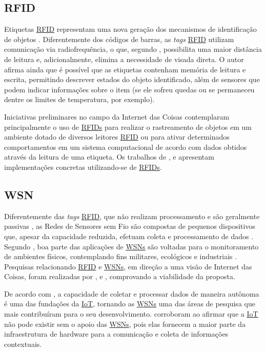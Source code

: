 \documentclass[twoside,english,brazilian]{UNISINOSmonografia}
\begin{document}
\subsection{RFID}
	Etiquetas \hyperref[siglas]{RFID} representam uma nova geração dos mecanismos de 
	identificação de objetos \cite{Brock2001}. Diferentemente dos códigos de 
	barras, as \textit{tags} \hyperref[siglas]{RFID} utilizam comunicação via radiofrequência, o 
	que, segundo , possibilita uma maior distância de 
	leitura e, adicionalmente, elimina a necessidade de visada direta. O autor 
	afirma ainda que é possível que as etiquetas contenham memória de leitura 
	e escrita, permitindo descrever estados do objeto identificado, além de 
	sensores que podem indicar informações sobre o item (se ele sofreu quedas 
	ou se permaneceu dentre os limites de temperatura, por exemplo).
	
	Iniciativas preliminares no campo da Internet das Coisas contemplaram 
	principalmente o uso de \hyperref[siglas]{RFIDs} para realizar o rastreamento de objetos em 
	um ambiente dotado de diversos leitores \hyperref[siglas]{RFID} ou para ativar determinados 
	comportamentos em um sistema computacional de acordo com dados obtidos 
	através da leitura de uma etiqueta. Os trabalhos de , 
	 e  apresentam 
	implementações concretas utilizando-se de \hyperref[siglas]{RFIDs}.

\subsection{WSN}
	Diferentemente das \textit{tags} \hyperref[siglas]{RFID}, que não realizam processamento e 
	são geralmente passivas \cite{Atzori2010b}, as Redes de Sensores sem Fio 
	são compostas de pequenos dispositivos que, apesar da capacidade reduzida, 
	efetuam coleta e processamento de dados \cite{Sakthidharan2012}. Segundo 
	, boa parte das aplicações de \hyperref[siglas]{WSNs} são voltadas para 
	o monitoramento de ambientes físicos, contemplando fins militares, 
	ecológicos e industriais \cite{Suhonen2012}. Pesquisas relacionando \hyperref[siglas]{RFID} e 
	\hyperref[siglas]{WSNs}, em direção a uma visão de Internet das Coisas, foram realizadas por 
	,  e , 
	comprovando a viabilidade da proposta.
	
	De acordo com , a capacidade de coletar e processar 
	dados de maneira autônoma é uma das fundações da \hyperref[siglas]{IoT}, tornando as \hyperref[siglas]{WSNs} uma 
	das áreas de pesquisa que mais contribuíram para o seu desenvolvimento. 
	 corroboram ao afirmar que a \hyperref[siglas]{IoT} não pode existir sem 
	o apoio das \hyperref[siglas]{WSNs}, pois elas fornecem a maior parte da infraestrutura de 
	hardware para a comunicação e coleta de informações contextuais.
\end{document}
